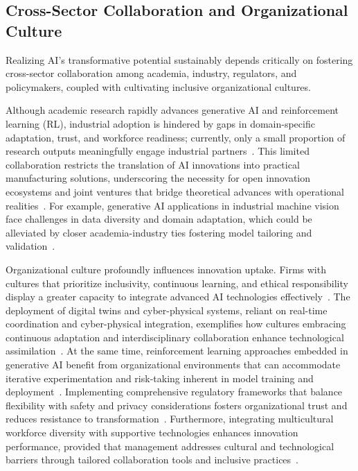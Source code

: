 \documentclass[sigconf]{acmart}
\begin{document}
\subsection{Cross-Sector Collaboration and Organizational Culture}

Realizing AI’s transformative potential sustainably depends critically on fostering cross-sector collaboration among academia, industry, regulators, and policymakers, coupled with cultivating inclusive organizational cultures.

Although academic research rapidly advances generative AI and reinforcement learning (RL), industrial adoption is hindered by gaps in domain-specific adaptation, trust, and workforce readiness; currently, only a small proportion of research outputs meaningfully engage industrial partners~\cite{ref7}. This limited collaboration restricts the translation of AI innovations into practical manufacturing solutions, underscoring the necessity for open innovation ecosystems and joint ventures that bridge theoretical advances with operational realities~\cite{ref3}. For example, generative AI applications in industrial machine vision face challenges in data diversity and domain adaptation, which could be alleviated by closer academia-industry ties fostering model tailoring and validation~\cite{ref3}.

Organizational culture profoundly influences innovation uptake. Firms with cultures that prioritize inclusivity, continuous learning, and ethical responsibility display a greater capacity to integrate advanced AI technologies effectively~\cite{ref22,ref27}. The deployment of digital twins and cyber-physical systems, reliant on real-time coordination and cyber-physical integration, exemplifies how cultures embracing continuous adaptation and interdisciplinary collaboration enhance technological assimilation~\cite{ref22}. At the same time, reinforcement learning approaches embedded in generative AI benefit from organizational environments that can accommodate iterative experimentation and risk-taking inherent in model training and deployment~\cite{ref27}. Implementing comprehensive regulatory frameworks that balance flexibility with safety and privacy considerations fosters organizational trust and reduces resistance to transformation~\cite{ref3}. Furthermore, integrating multicultural workforce diversity with supportive technologies enhances innovation performance, provided that management addresses cultural and technological barriers through tailored collaboration tools and inclusive practices~\cite{ref24}.
\end{document}
